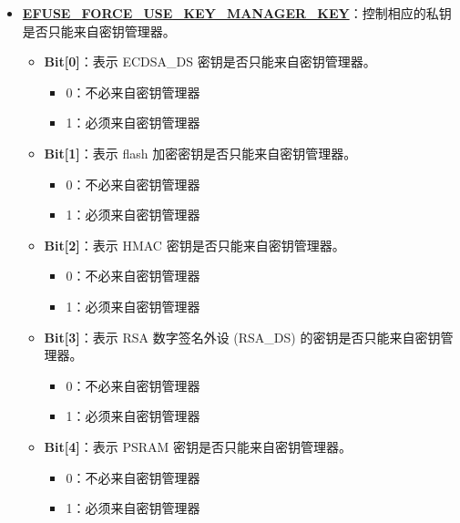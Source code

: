 \documentclass[main\_\_CN.tex]{subfiles}
\begin{document}
\begin{enumerate}
\begin{itemize}
\begin{itemize}
\begin{itemize}
                \item 0：可以部署多次
                \item 1：只能部署一次
            \end{itemize}
        \end{itemize}
        \item \textbf{\hyperref[fielddesc:EFUSEFORCEUSEKEYMANAGERKEY]{EFUSE\_FORCE\_USE\_KEY\_MANAGER\_KEY}}：控制相应的私钥是否只能来自密钥管理器。
        \begin{itemize}
            \item \textbf{Bit[0]}：表示 ECDSA\_DS 密钥是否只能来自密钥管理器。
            \begin{itemize}
                \item 0：不必来自密钥管理器
                \item 1：必须来自密钥管理器
            \end{itemize}
            \item \textbf{Bit[1]}：表示 flash 加密密钥是否只能来自密钥管理器。
            \begin{itemize}
                \item 0：不必来自密钥管理器
                \item 1：必须来自密钥管理器
            \end{itemize}
            \item \textbf{Bit[2]}：表示 HMAC 密钥是否只能来自密钥管理器。
            \begin{itemize}
                \item 0：不必来自密钥管理器
                \item 1：必须来自密钥管理器
            \end{itemize}
            \item \textbf{Bit[3]}：表示 RSA 数字签名外设 (RSA\_DS) 的密钥是否只能来自密钥管理器。
            \begin{itemize}
                \item 0：不必来自密钥管理器
                \item 1：必须来自密钥管理器
            \end{itemize}
            \item \textbf{Bit[4]}：表示 PSRAM 密钥是否只能来自密钥管理器。
            \begin{itemize}
                \item 0：不必来自密钥管理器
                \item 1：必须来自密钥管理器
            \end{itemize}

\end{itemize}
\end{itemize}
\end{enumerate}
\end{document}
